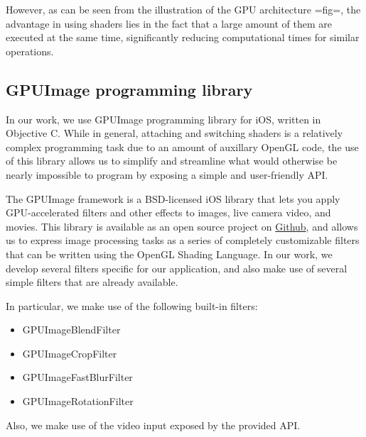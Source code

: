 However, as can be seen from the illustration of the GPU architecture {{=fig=}}, the advantage in using shaders lies in the fact that a large amount of them are executed at the same time, significantly reducing computational times for similar operations. 
\subsection{GPUImage programming library}
In our work, we use GPUImage programming library for iOS, written in Objective C. While in general, attaching and switching shaders is a relatively complex programming task due to an amount of auxillary OpenGL code, the use of this library allows us to simplify and  streamline what would otherwise be nearly impossible to program by exposing a simple and user-friendly API. 

 The GPUImage framework is a BSD-licensed iOS library that lets you apply GPU-accelerated filters and other effects to images, live camera video, and movies. This library is available as an open source project on \href{https://github.com/BradLarson/GPUImage}{Github}, and allows us to express image processing tasks as a series of completely customizable filters that can be written using the OpenGL Shading Language. In our work, we develop several filters specific for our application, and also make use of several simple filters that are already available.

In particular, we make use of the following built-in filters: 
\begin{itemize}
 \item  GPUImageBlendFilter
 \item   GPUImageCropFilter
 \item GPUImageFastBlurFilter
 \item GPUImageRotationFilter
\end{itemize} 
Also, we make use of the video input exposed by the provided API. 

